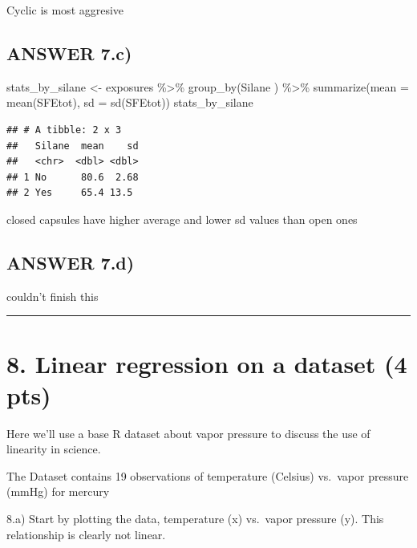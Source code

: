 \documentclass[
]{article}
\newenvironment{Shaded}{\begin{snugshade}}{\end{snugshade}}
\newcommand{\AttributeTok}[1]{\textcolor[rgb]{0.77,0.63,0.00}{#1}}
\newcommand{\FunctionTok}[1]{\textcolor[rgb]{0.00,0.00,0.00}{#1}}
\newcommand{\NormalTok}[1]{#1}
\newcommand{\OtherTok}[1]{\textcolor[rgb]{0.56,0.35,0.01}{#1}}
\newcommand{\SpecialCharTok}[1]{\textcolor[rgb]{0.00,0.00,0.00}{#1}}
\begin{document}
Cyclic is most aggresive

\hypertarget{answer-7.c}{%
\subsection{ANSWER 7.c)}\label{answer-7.c}}

\begin{Shaded}
\begin{Highlighting}[]
\NormalTok{stats\_by\_silane }\OtherTok{\textless{}{-}}\NormalTok{ exposures }\SpecialCharTok{\%\textgreater{}\%} \FunctionTok{group\_by}\NormalTok{(Silane}
\NormalTok{                      ) }\SpecialCharTok{\%\textgreater{}\%} \FunctionTok{summarize}\NormalTok{(}\AttributeTok{mean =} \FunctionTok{mean}\NormalTok{(SFEtot),}
                                      \AttributeTok{sd =} \FunctionTok{sd}\NormalTok{(SFEtot))}
\NormalTok{stats\_by\_silane}
\end{Highlighting}
\end{Shaded}

\begin{verbatim}
## # A tibble: 2 x 3
##   Silane  mean    sd
##   <chr>  <dbl> <dbl>
## 1 No      80.6  2.68
## 2 Yes     65.4 13.5
\end{verbatim}

closed capsules have higher average and lower sd values than open ones

\hypertarget{answer-7.d}{%
\subsection{ANSWER 7.d)}\label{answer-7.d}}

couldn't finish this

\begin{center}\rule{0.5\linewidth}{0.5pt}\end{center}

\hypertarget{linear-regression-on-a-dataset-4-pts}{%
\section{8. Linear regression on a dataset (4
pts)}\label{linear-regression-on-a-dataset-4-pts}}

Here we'll use a base R dataset about vapor pressure to discuss the use
of linearity in science.

The Dataset contains 19 observations of temperature (Celsius) vs.~vapor
pressure (mmHg) for mercury

8.a) Start by plotting the data, temperature (x) vs.~vapor pressure (y).
This relationship is clearly not linear.
\end{document}
